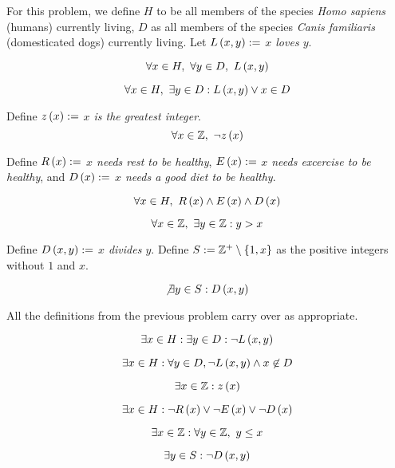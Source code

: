 \documentclass{article}
\begin{document}
\problem

For this problem, we define $H$ to be all members of the species \emph{Homo sapiens} (humans) currently living, $D$ as all members of the species \emph{Canis familiaris} (domesticated dogs) currently living. Let $L\left (x, y \right) := $ \emph{$x$ loves $y$}.

\subproblema
$$
\forall x \in H,\ \forall y \in D,\ L \left (x, y \right)
$$

\subproblema
$$
\forall x \in H,\ \exists y \in D : L \left (x, y \right) \lor x \in D
$$

\subproblema
Define $z \left (x \right) := $ \emph{$x$ is the greatest integer}.
$$
\forall x \in \mathbb Z,\ \lnot z \left (x \right)
$$

\subproblema
Define $R \left (x \right) := $ \emph{$x$ needs rest to be healthy}, $E \left (x \right) := $ \emph{$x$ needs excercise to be healthy}, and $D \left (x \right) := $ \emph{$x$ needs a good diet to be healthy}.

$$
\forall x \in H,\ R \left (x \right) \land E\left (x \right) \land D\left (x \right)
$$

\subproblema
$$
\forall x \in \mathbb Z,\ \exists y \in \mathbb Z : y > x
$$

\subproblema
Define $D \left (x, y \right) := $ \emph{$x$ divides $y$}.
Define $S := \mathbb Z^+ \setminus \left \{ 1, x \right \} $ as the positive integers without $1$ and $x$.

$$
\not \exists y \in S : D \left (x, y \right)
$$

\problem

All the definitions from the previous problem carry over as appropriate.

\subproblema

$$
\exists x \in H : \exists y \in D : \lnot L \left (x, y \right)
$$


\subproblema

$$
\exists x \in H : \forall y \in D, \lnot L \left (x, y \right) \land x \not \in D
$$

\subproblema

$$
\exists x \in \mathbb Z : z \left (x \right)
$$

\subproblema

$$
\exists x \in H : \lnot R \left (x \right) \lor \lnot E \left (x \right) \lor \lnot D \left (x \right)
$$

\subproblema

$$
\exists x \in \ZZ : \forall y \in \ZZ,\ y \leq x
$$

\subproblema

$$
\exists y \in S : \lnot D \left (x, y \right)
$$


\problem
\end{document}
